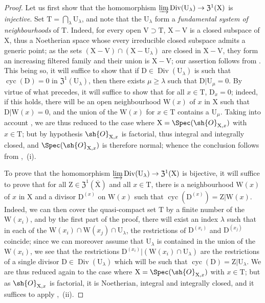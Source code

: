 \begin{proof}
Let us first show that the homomorphism $\varinjlim\operatorname{Div}(\mathrm{U}_\lambda)\to\mathfrak{Z}^1(\mathrm{X})$ is \emph{injective}.
Set $\mathrm{T}=\bigcap_\lambda\mathrm{U}_\lambda$, and note that the $\mathrm{U}_\lambda$ form a \emph{fundamental system of neighbourhoods} of $\mathrm{T}$.
Indeed, for every open $\mathrm{V}\supset\mathrm{T}$, $\mathrm{X}-\mathrm{V}$ is a closed subspace of $\mathrm{X}$, thus a Noetherian space whose every irreducible closed subspace admits a generic point;
as the sets $(\mathrm{X}-\mathrm{V})\cap(\mathrm{X}-\mathrm{U}_\lambda)$ are closed in $\mathrm{X}-\mathrm{V}$, they form an increasing filtered family and their union is $\mathrm{X}-\mathrm{V}$;
our assertion follows from .
This being so, it will suffice to show that if $\mathrm{D}\in\operatorname{Div}(\mathrm{U}_\lambda)$ is such that $\operatorname{cyc}(\mathrm{D})=0$ in $\mathfrak{Z}^1(\mathrm{U}_\lambda)$, then there exists $\mu\geq\lambda$ such that $\mathrm{D}|\mathrm{U}_\mu=0$.
By virtue of what precedes, it will suffice to show that for all $x\in\mathrm{T}$, $\mathrm{D}_x=0$;
indeed, if this holds, there will be an open neighbourhood $\mathrm{W}(x)$ of $x$ in $\mathrm{X}$ such that $\mathrm{D}|\mathrm{W}(x)=0$, and the union of the $\mathrm{W}(x)$ for $x\in\mathrm{T}$ contains a $\mathrm{U}_\mu$.
Taking into account , we are thus reduced to the case where $\mathrm{X}=\Spec(\sh{O}_{\mathrm{X},x})$ with $x\in\mathrm{T}$;
but by hypothesis $\sh{O}_{\mathrm{X},x}$ is factorial, thus integral and integrally closed, and $\Spec(\sh{O}_{\mathrm{X},x})$ is therefore normal;
whence the conclusion follows from ,{}~(i).

To prove that the homomorphism $\varinjlim\operatorname{Div}(\mathrm{U}_\lambda)\to\mathfrak{Z}^1(\mathrm{X})$ is bijective, it will suffice to prove that for all $\mathrm{Z}\in\mathfrak{Z}^1(\overline{\mathrm{X}})$ and all $x\in\mathrm{T}$, there is a neighbourhood $\mathrm{W}(x)$ of $x$ in $\mathrm{X}$ and a divisor $\mathrm{D}^{(x)}$ on $\mathrm{W}(x)$ such that $\operatorname{cyc}(\mathrm{D}^{(x)})=\mathrm{Z}|\mathrm{W}(x)$.
Indeed, we can then cover the quasi-compact set $\mathrm{T}$ by a finite number of the $\mathrm{W}(x_i)$, and by the first part of the proof, there will exist an index $\lambda$ such that in each of the $\mathrm{W}(x_i)\cap\mathrm{W}(x_j)\cap\mathrm{U}_\lambda$, the restrictions of $\mathrm{D}^{(x_i)}$ and $\mathrm{D}^{(x_j)}$ coincide;
since we can moreover assume that $\mathrm{U}_\lambda$ is contained in the union of the $\mathrm{W}(x_i)$, we see that the restrictions $\mathrm{D}^{(x_i)}|(\mathrm{W}(x_i)\cap\mathrm{U}_\lambda)$ are the restrictions of a single divisor $\mathrm{D}\in\operatorname{Div}(\mathrm{U}_\lambda)$ which will be such that $\operatorname{cyc}(\mathrm{D})=\mathrm{Z}|\mathrm{U}_\lambda$.
We are thus reduced again to the case where $\mathrm{X}=\Spec(\sh{O}_{\mathrm{X},x})$ with $x\in\mathrm{T}$;
but as $\sh{O}_{\mathrm{X},x}$ is factorial, it is Noetherian, integral and integrally closed, and it suffices to apply ,{}~(ii).
\end{proof}

